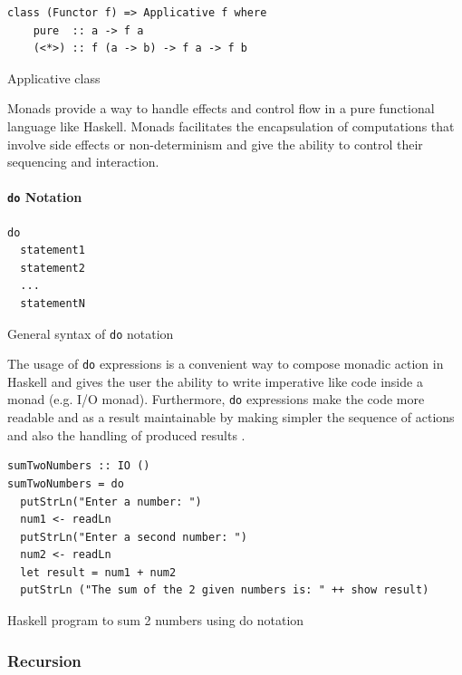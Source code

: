 \documentclass[a4paper, titlepage, twoside]{article}
\begin{document}
\begin{listing}[htbp]
\begin{verbatim}
class (Functor f) => Applicative f where
    pure  :: a -> f a
    (<*>) :: f (a -> b) -> f a -> f b
\end{verbatim}
\caption{Applicative class \autocite[chapter 29.1.1]{wikibooksHaskellWikibooksFree2022}}
\end{listing}

Monads provide a way to handle effects and control flow in a pure functional language like Haskell. Monads facilitates the encapsulation of computations that involve side effects or non-determinism and give the ability to control their sequencing and interaction.

\paragraph*{\texttt{do} Notation}
\label{sec:org066bd2b}

\begin{listing}[htbp]
\begin{verbatim}
do
  statement1
  statement2
  ...
  statementN
\end{verbatim}
\caption{General syntax of \texttt{do} notation}
\end{listing}

The usage of \texttt{do} expressions is a convenient way to compose monadic action in Haskell and gives the user the ability to write imperative like code inside a monad (e.g. I/O monad). Furthermore, \texttt{do} expressions make the code more readable and as a result maintainable by making simpler the sequence of actions and also the handling of produced results \autocite{kremerCPSC449Programming2015}.

\begin{listing}[htbp]
\begin{verbatim}
sumTwoNumbers :: IO ()
sumTwoNumbers = do
  putStrLn("Enter a number: ")
  num1 <- readLn
  putStrLn("Enter a second number: ")
  num2 <- readLn
  let result = num1 + num2
  putStrLn ("The sum of the 2 given numbers is: " ++ show result)
\end{verbatim}
\caption{Haskell program to sum 2 numbers using do notation \autocite[chapter 10.2]{wikibooksHaskellWikibooksFree2022}}
\end{listing}

\subsubsection{Recursion}
\label{sec:orga387c8d}
\end{document}
